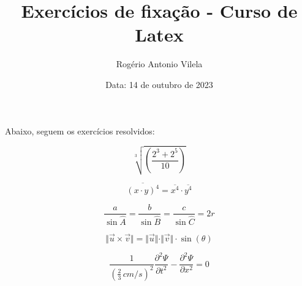 \documentclass[a4paper, 12pt]{article}
\title{\textbf{Exercícios de fixação - Curso de Latex}}
\author{Rogério Antonio Vilela}
\date{Data: 14 de outubro de 2023}
\begin{document}
\maketitle

Abaixo, seguem os exercícios resolvidos:

\begin{equation}
\sqrt[3]{\left( \frac{2^{3} + 2^{5}}{10}\right)}
\end{equation}

\begin{equation}
\overline{(x \cdot y)^4} = \overline{x^{4}} \cdot \overline{y^{4}}
\end{equation}

\begin{equation}
\frac{a}{\sin \widehat{A}} = \frac{b}{\sin \widehat{B}} = \frac{c}{\sin \widehat{C}} = 2r
\end{equation}

\begin{equation}
\Vert\vec{u} \times \vec{v} \Vert = \Vert \vec{u} \Vert \cdot \Vert \vec{v} \Vert \cdot \sin(\theta)
\end{equation}

\begin{equation}
\frac{1}{\left( \frac{2}{3} \, cm/s \right) ^{2}}\frac{\partial^{2}\Psi}{\partial t^2} - \frac{\partial^{2}\Psi}{\partial x^2} = 0
\end{equation}
\end{document}

